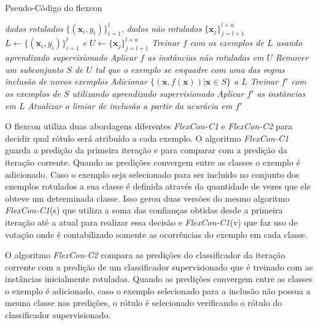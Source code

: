     \begin{algorithm}[H]
        \caption{Pseudo\hyp{Código} do \acs{flexcon}}
        \label{alg:flexcon-c}
        \SetAlgoLined
        \begin{algorithmic}[1]
            \REQUIRE \textit{dados rotulados} $\{(\mathbf{x}_i, y_i)\}^l_{i = 1}$, \textit{dados não rotulados} $\{\mathbf{x}_j\}^{l+u}_{j=l+1}$
            \ENSURE $L \leftarrow \{(\mathbf{x}_i, y_i)\}^l_{i = 1}$ \textit{e} $U \leftarrow \{\mathbf{x}_j\}^{l+u}_{j = l+1}$
            \REPEAT
            	\STATE \textit{Treinar $f$ com os exemplos de $L$ usando aprendizado supervisionado}
            	\STATE \textit{Aplicar $f$ as instâncias não rotuladas em $U$}
            	\STATE \textit{Remover um subconjunto $S$ de $U$ tal que o exemplo se enquadre com uma das regras inclusão de novos exemplos}
            	\STATE \textit{Adicionar $\{(\mathbf{x}, f(\mathbf{x}))|\mathbf{x} \in  S\}$ a $L$}
            	\STATE \textit{Treinar $f'$ com os exemplos de $S$ utilizando aprendizado supervisionado}
            	\STATE \textit{Aplicar $f'$ as instâncias em $L$}
            	\STATE \textit{Atualizar o limiar de inclusão a partir da acurácia em $f'$}
        \end{algorithmic}
    \end{algorithm}
	\begin{center}
        \vspace{-2em}
	\end{center}
    
    
    
    O \ac{flexcon} utiliza duas abordagens diferentes \textit{FlexCon\hyp{C1}} e \textit{FlexCon\hyp{C2}} para decidir qual rótulo será atribuído a cada exemplo. O algoritmo \textit{FlexCon\hyp{C1}} guarda a predição da primeira iteração e para comparar com a predição da iteração corrente. Quando as predições convergem entre as classes o exemplo é adicionado. Caso o exemplo seja selecionado para ser incluído no conjunto dos exemplos rotulados a sua classe é definida através da quantidade de vezes que ele obteve um determinada classe. Isso gerou duas versões do mesmo algoritmo \textit{FlexCon\hyp{C1}}(s) que utiliza a soma das confianças obtidas desde a primeira iteração até a atual para realizar essa decisão e \textit{FlexCon\hyp{C1}}(v) que faz uso de votação onde é contabilizado somente as ocorrências do exemplo em cada classe.
        
    
    O algoritmo \textit{FlexCon\hyp{C2}} compara as predições do classificador da iteração corrente com a predição de um classificador supervisionado que é treinado com as instâncias inicialmente rotuladas. Quando as predições convergem entre as classes o exemplo é adicionado, caso o exemplo selecionado para a inclusão não possua a mesma classe nas predições, o rótulo é selecionado verificando o rótulo do classificador supervisionado.
    
